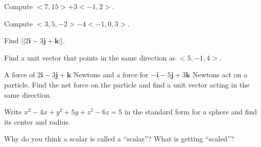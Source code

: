 \documentclass{exam}[12pt]
\begin{document}
\pagestyle{head}

\extraheadheight{-.3in}
\extrafootheight{-.3in} 


\vspace{.2in}
\large{

\begin{questions}

\question Compute $<7,15> + 3<-1,2>$.
\vspace{.5in}

\question Compute $<3,5,-2> - 4<-1,0,3>$.
\vspace{.5in}

\question Find $||2\mathbf{i} -3\mathbf{j} +\mathbf{k}||$.
\vspace{.5in}

\question Find a unit vector that points in the same direction as $<5,-1,4>$.

\vspace{1in}
\question A force of $2\mathbf{i} -3\mathbf{j} +\mathbf{k}$ Newtons and a force for $-\mathbf{i} -5\mathbf{j} + 3\mathbf{k}$ Newtons act on a particle.  Find the net force on the particle and find a unit vector acting in the same direction.

\vspace{1.9in}
\question Write $x^2 -4x +y^2+5y+z^2-6z=5$ in the standard form for a sphere and find its center and radius.

\vspace{2.5in}
\question Why do you think a scalar is called a ``scalar''?  What is getting ``scaled''?


\end{questions}

}
\end{document}
